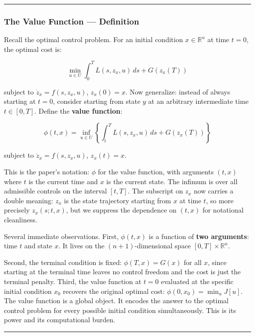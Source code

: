 \documentclass{article}
\begin{document}
\medskip\hrule\medskip

\subsubsection{The Value Function --- Definition}

Recall the optimal control problem. For an initial condition $x \in \mathbb{R}^n$ at time $t = 0$, the optimal cost is:

$$\min_{u \in U} \int_0^T L(s, z_x, u)\, ds + G(z_x(T))$$

subject to $\dot{z}_x = f(s, z_x, u)$, $z_x(0) = x$. Now generalize: instead of always starting at $t = 0$, consider starting from state $y$ at an arbitrary intermediate time $t \in [0, T]$. Define the \textbf{value function}:

\begin{equation}
\phi(t, x) = \inf_{u \in U} \left\{ \int_t^T L(s, z_x, u)\, ds + G(z_x(T)) \right\}
\label{eq:value-function}
\end{equation}

subject to $\dot{z}_x = f(s, z_x, u)$, $z_x(t) = x$.

This is the paper's notation: $\phi$ for the value function, with arguments $(t, x)$ where $t$ is the current time and $x$ is the current state. The infimum is over all admissible controls on the interval $[t, T]$. The subscript on $z_x$ now carries a double meaning: $z_x$ is the state trajectory starting from $x$ at time $t$, so more precisely $z_x(s; t, x)$, but we suppress the dependence on $(t,x)$ for notational cleanliness.

Several immediate observations. First, $\phi(t, x)$ is a function of \textbf{two arguments}: time $t$ and state $x$. It lives on the $(n+1)$-dimensional space $[0,T] \times \mathbb{R}^n$.

\begin{tldrbox}
Second, the terminal condition is fixed: $\phi(T, x) = G(x)$ for all $x$, since starting at the terminal time leaves no control freedom and the cost is just the terminal penalty. Third, the value function at $t=0$ evaluated at the specific initial condition $x_0$ recovers the original optimal cost: $\phi(0, x_0) = \min_u J[u]$. The value function is a global object. It encodes the answer to the optimal control problem for every possible initial condition simultaneously. This is its power and its computational burden.
\end{tldrbox}

\medskip\hrule\medskip
\end{document}
